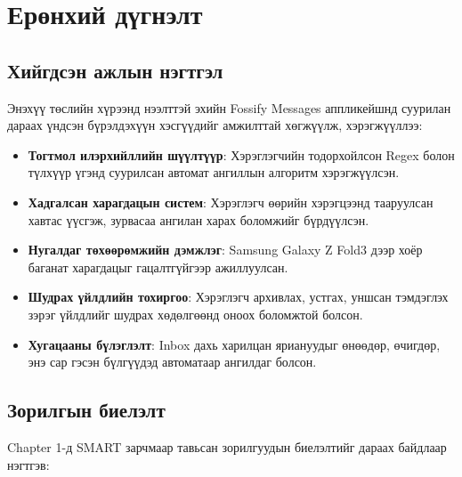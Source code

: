 \chapter{Ерөнхий дүгнэлт}

\section{Хийгдсэн ажлын нэгтгэл}
Энэхүү төслийн хүрээнд нээлттэй эхийн Fossify Messages
аппликейшнд суурилан дараах үндсэн бүрэлдэхүүн хэсгүүдийг
амжилттай хөгжүүлж, хэрэгжүүллээ:

\begin{itemize}
    \item \textbf{Тогтмол илэрхийллийн шүүлтүүр}:
    Хэрэглэгчийн тодорхойлсон Regex болон түлхүүр үгэнд
    суурилсан автомат ангиллын алгоритм хэрэгжүүлсэн.

    \item \textbf{Хадгалсан харагдацын систем}:
    Хэрэглэгч өөрийн хэрэгцээнд тааруулсан хавтас
    үүсгэж, зурвасаа ангилан харах боломжийг бүрдүүлсэн.

    \item \textbf{Нугалдаг төхөөрөмжийн дэмжлэг}:
    Samsung Galaxy Z Fold3 дээр хоёр баганат харагдацыг
    гацалтгүйгээр ажиллуулсан.

    \item \textbf{Шудрах үйлдлийн тохиргоо}:
    Хэрэглэгч архивлах, устгах, уншсан тэмдэглэх зэрэг
    үйлдлийг шудрах хөдөлгөөнд оноох боломжтой болсон.

    \item \textbf{Хугацааны бүлэглэлт}:
    Inbox дахь харилцан яриануудыг өнөөдөр, өчигдөр,
    энэ сар гэсэн бүлгүүдэд автоматаар ангилдаг болсон.
\end{itemize}

\section{Зорилгын биелэлт}
Chapter 1-д SMART зарчмаар тавьсан зорилгуудын биелэлтийг
дараах байдлаар нэгтгэв:

